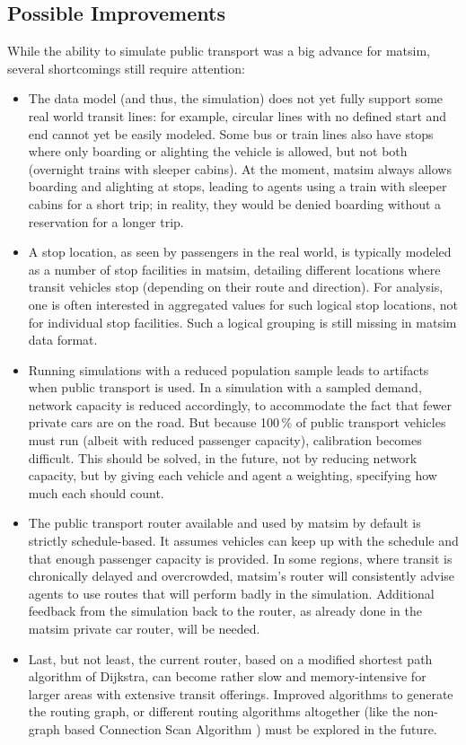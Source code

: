 \subsection{Possible Improvements}
While the ability to simulate public transport was a big advance for \gls{matsim},
several shortcomings still require attention:
%
\begin{itemize}\styleItemize
	\item The data model (and thus, the simulation) does not yet fully support some
	real world transit lines: for example, circular lines with no
	defined start and end cannot yet be easily modeled. Some bus or
	train lines also have stops where only boarding or alighting the vehicle is allowed,
	but not both (\eg overnight trains with sleeper cabins). At the moment, \gls{matsim}
	always allows boarding and alighting at stops, leading to agents \eg using a
	train with sleeper cabins for a short trip; in reality, they would be
	denied boarding without a reservation for a longer trip.
	\item A stop location, as seen by passengers in the real world, is
	typically modeled as a number of stop facilities in \gls{matsim}, detailing 
	different locations where transit vehicles stop (depending on their route and
	direction). For analysis, one is often interested in aggregated values
	for such logical stop locations, not for individual stop facilities.
	Such a logical grouping is still missing in \gls{matsim} data format.
	\item Running simulations with a reduced population sample leads to
	artifacts when public transport is used. In a simulation with a sampled demand,
	network capacity is reduced accordingly, to accommodate the fact that fewer
	private cars are on the road. But because 100\,\% of public transport vehicles
	must run (albeit with reduced passenger capacity), calibration becomes
	difficult. This should be solved, in the future, not by reducing network
	capacity, but by giving each vehicle and agent a weighting, specifying how much each should
	count.
	\item The public transport router available and used by \gls{matsim} by default is
	strictly schedule-based. It assumes vehicles can keep up with the
	schedule and that enough passenger capacity is provided. In some regions, where
	transit is chronically delayed and overcrowded, \gls{matsim}'s router will
	consistently advise agents to use routes that will perform badly in the
	simulation. Additional feedback from the simulation back to the router, as 
	already done in the \gls{matsim} private car router, will be needed.
	\item Last, but not least, the current router, based on a modified shortest path
	algorithm of Dijkstra, can become rather slow and memory-intensive for
	larger areas with extensive transit offerings. Improved algorithms to generate
	the routing graph, or different routing algorithms altogether (like the
	non-graph based Connection Scan Algorithm
	\citep{DibbeltEtAl_BonifaciEtAl_2013}) must be explored in the
	future.
\end{itemize}

